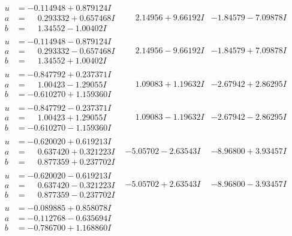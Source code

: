 \documentclass[1p]{elsarticle_modified}
\theoremstyle{definition}
\begin{document}
$$\begin{array}{c|c|c}
\begin{aligned}
u &= -0.114948 + 0.879124 I \\
a &= \phantom{-}0.293332 + 0.657468 I \\
b &= \phantom{-}1.34552 - 1.00402 I\end{aligned}
 & \phantom{-}2.14956 + 9.66192 I & -1.84579 - 7.09878 I \\ \hline\begin{aligned}
u &= -0.114948 - 0.879124 I \\
a &= \phantom{-}0.293332 - 0.657468 I \\
b &= \phantom{-}1.34552 + 1.00402 I\end{aligned}
 & \phantom{-}2.14956 - 9.66192 I & -1.84579 + 7.09878 I \\ \hline\begin{aligned}
u &= -0.847792 + 0.237371 I \\
a &= \phantom{-}1.00423 - 1.29055 I \\
b &= -0.610270 + 1.159360 I\end{aligned}
 & \phantom{-}1.09083 + 1.19632 I & -2.67942 + 2.86295 I \\ \hline\begin{aligned}
u &= -0.847792 - 0.237371 I \\
a &= \phantom{-}1.00423 + 1.29055 I \\
b &= -0.610270 - 1.159360 I\end{aligned}
 & \phantom{-}1.09083 - 1.19632 I & -2.67942 - 2.86295 I \\ \hline\begin{aligned}
u &= -0.620020 + 0.619213 I \\
a &= \phantom{-}0.637420 + 0.321223 I \\
b &= \phantom{-}0.877359 + 0.237702 I\end{aligned}
 & -5.05702 - 2.63543 I & -8.96800 + 3.93457 I \\ \hline\begin{aligned}
u &= -0.620020 - 0.619213 I \\
a &= \phantom{-}0.637420 - 0.321223 I \\
b &= \phantom{-}0.877359 - 0.237702 I\end{aligned}
 & -5.05702 + 2.63543 I & -8.96800 - 3.93457 I \\ \hline\begin{aligned}
u &= -0.089885 + 0.858078 I \\
a &= -0.112768 - 0.635694 I \\
b &= -0.786700 + 1.168860 I\end{aligned}

\end{array}$$
\end{document}

